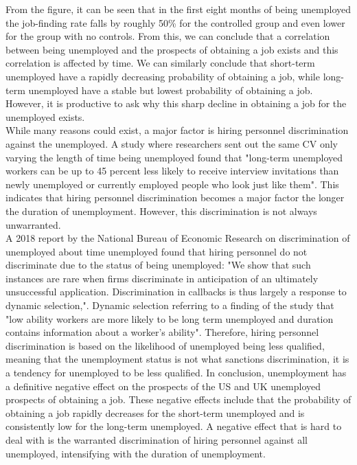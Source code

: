 From the figure, it can be seen that in the first eight months of being unemployed the job-finding rate falls by roughly 50\% for the controlled group and even lower for the group with no controls.
From this, we can conclude that a correlation between being unemployed and the prospects of obtaining a job exists and this correlation is affected by time.
We can similarly conclude that short-term unemployed have a rapidly decreasing probability of obtaining a job, while long-term unemployed have a stable but lowest probability of obtaining a job. 
However, it is productive to ask why this sharp decline in obtaining a job for the unemployed exists. \\
 
While many reasons could exist, a major factor is hiring personnel discrimination against the unemployed.
A study where researchers sent out the same CV only varying the length of time being unemployed found 
that "long-term unemployed workers can be up to 45 percent less likely to receive interview invitations than newly unemployed or currently employed people who look just like them".\cite{Unemployment_effect_unemployed}
This indicates that hiring personnel discrimination becomes a major factor the longer the duration of unemployment.
However, this discrimination is not always unwarranted. \\
 
A 2018 report by the National Bureau of Economic Research on discrimination of unemployed about time unemployed found that hiring personnel do not discriminate due to the status of being unemployed:\cite{Unemployment_Discrimination}
"We show that such instances are rare when firms discriminate in anticipation of an ultimately unsuccessful application. Discrimination in callbacks is thus largely a response to dynamic selection,".
Dynamic selection referring to a finding of the study that "low ability workers are more likely to be long term unemployed and duration contains information about a worker’s ability".
Therefore, hiring personnel discrimination is based on the likelihood of unemployed being less qualified, meaning that the unemployment status is not what sanctions discrimination, it is a tendency for unemployed to be less qualified.
In conclusion, unemployment has a definitive negative effect on the prospects of the US and UK unemployed prospects of obtaining a job.
These negative effects include that the probability of obtaining a job rapidly decreases for the short-term unemployed and is consistently low for the long-term unemployed.
A negative effect that is hard to deal with is the warranted discrimination of hiring personnel against all unemployed, intensifying with the duration of unemployment. \\
 
